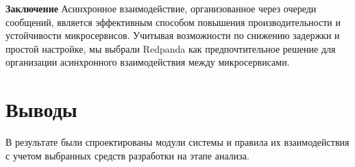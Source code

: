 \textbf{Заключение}
Асинхронное взаимодействие, организованное через очереди сообщений, является эффективным способом повышения производительности и устойчивости микросервисов. Учитывая возможности по снижению задержки и простой настройке, мы выбрали Redpanda как предпочтительное решение для организации асинхронного взаимодействия между микросервисами.

\section{Выводы}

В результате были спроектированы модули системы и правила их взаимодействия с учетом выбранных средств разработки
на этапе анализа.














